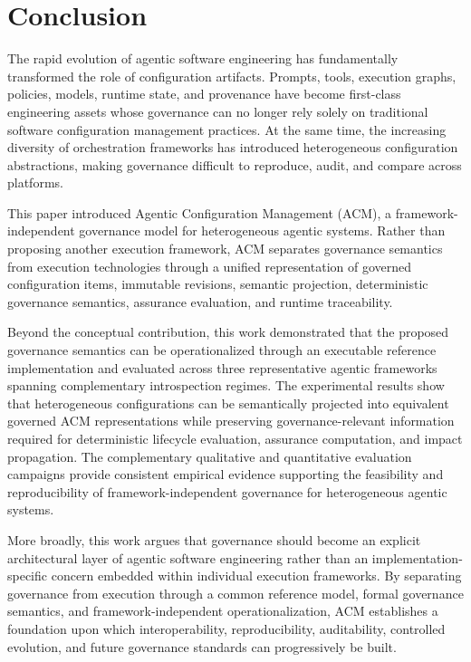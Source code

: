 \documentclass[10pt]{article}
\begin{document}
\section{Conclusion}
\label{sec:conclusion}

The rapid evolution of agentic software engineering has fundamentally transformed the role of configuration artifacts. Prompts, tools, execution graphs, policies, models, runtime state, and provenance have become first-class engineering assets whose governance can no longer rely solely on traditional software configuration management practices. At the same time, the increasing diversity of orchestration frameworks has introduced heterogeneous configuration abstractions, making governance difficult to reproduce, audit, and compare across platforms.

This paper introduced Agentic Configuration Management (ACM), a framework-independent governance model for heterogeneous agentic systems. Rather than proposing another execution framework, ACM separates governance semantics from execution technologies through a unified representation of governed configuration items, immutable revisions, semantic projection, deterministic governance semantics, assurance evaluation, and runtime traceability.

Beyond the conceptual contribution, this work demonstrated that the proposed governance semantics can be operationalized through an executable reference implementation and evaluated across three representative agentic frameworks spanning complementary introspection regimes. The experimental results show that heterogeneous configurations can be semantically projected into equivalent governed ACM representations while preserving governance-relevant information required for deterministic lifecycle evaluation, assurance computation, and impact propagation. The complementary qualitative and quantitative evaluation campaigns provide consistent empirical evidence supporting the feasibility and reproducibility of framework-independent governance for heterogeneous agentic systems.

More broadly, this work argues that governance should become an explicit architectural layer of agentic software engineering rather than an implementation-specific concern embedded within individual execution frameworks. By separating governance from execution through a common reference model, formal governance semantics, and framework-independent operationalization, ACM establishes a foundation upon which interoperability, reproducibility, auditability, controlled evolution, and future governance standards can progressively be built.
\end{document}
